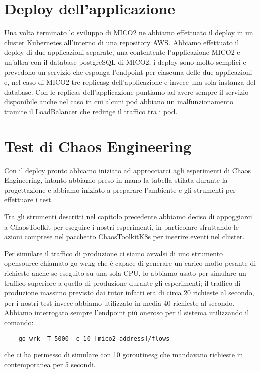 \section{Deploy dell'applicazione}
Una volta terminato lo sviluppo di MICO2 ne abbiamo effettuato il deploy in un cluster Kubernetes all'interno di una repository AWS.
Abbiamo effettuato il deploy di due applicazioni separate, una contentente l'applicazione MICO2 e un'altra con il database postgreSQL di MICO2; i deploy sono molto semplici e prevedono un servizio che esponga l'endpoint per ciascuna delle due applicazioni e, nel caso di MICO2 tre \gls{replicasg} dell'applicazione e invece una sola instanza del database.
Con le replicas dell'applicazione puntiamo ad avere sempre il servizio disponibile anche nel caso in cui alcuni pod abbiano un malfunzionamento tramite il LoadBalancer che redirige il traffico tra i pod.

\section{Test di Chaos Engineering}
Con il deploy pronto abbiamo iniziato ad approcciarci agli esperimenti di Chaos Engineering, intanto abbiamo preso in mano la tabella stilata durante la progettazione e abbiamo iniziato a preparare l'ambiente e gli strumenti per effettuare i test.

Tra gli strumenti descritti nel capitolo precedente abbiamo deciso di appoggiarci a ChaosToolkit per eseguire i nostri esperimenti, in particolare sfruttando le azioni comprese nel pacchetto ChaosToolkitK8s per inserire eventi nel cluster.

Per simulare il traffico di produzione ci siamo avvalsi di uno strumento opensource chiamato \gls{go-wrkg} che è capace di generare un carico molto pesante di richieste anche se eseguito su una sola CPU, lo abbiamo usato per simulare un traffico superiore a quello di produzione durante gli esperimenti; il traffico di produzione massimo previsto dai tutor infatti era di circa 20 richieste al secondo, per i nostri test invece abbiamo utilizzato in media 40 richieste al secondo.
Abbiamo interrogato sempre l'endpoint più oneroso per il sistema utilizzando il comando:
\begin{verbatim}
    go-wrk -T 5000 -c 10 [mico2-address]/flows
\end{verbatim}

che ci ha permesso di simulare con 10 \gls{goroutinesg} che mandavano richieste in contemporanea per 5 secondi.

